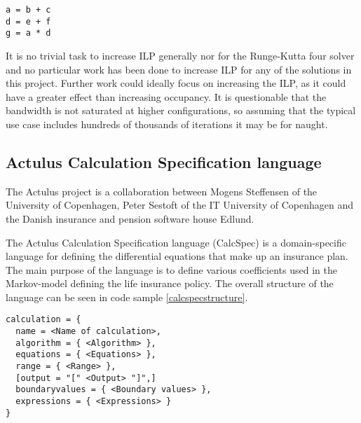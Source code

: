 \begin{lstlisting}[caption=ILP example program, label=ilpexample]
a = b + c
d = e + f
g = a * d
\end{lstlisting}

It is no trivial task to increase ILP generally nor for the Runge-Kutta four solver and no particular work has been done to increase ILP for any of the solutions in this project.
Further work could ideally focus on increasing the ILP, as it could have a greater effect than increasing occupancy.
It is questionable that the bandwidth is not saturated at higher configurations, so assuming that the typical use case includes hundreds of thousands of iterations it may be for naught.

\subsection{Actulus Calculation Specification language}\label{subsec:background:calcspec}
The Actulus project is a collaboration between Mogens Steffensen of the University of Copenhagen, Peter Sestoft of the IT University of Copenhagen and the Danish insurance and pension software house Edlund.

The Actulus Calculation Specification language (CalcSpec) is a domain-specific language for defining the differential equations that make up an insurance plan.
The main purpose of the language is to define various coefficients used in the Markov-model defining the life insurance policy.
The overall structure of the language can be seen in code sample \ref{calcspecstructure}.
\begin{lstlisting}[caption=CalcSpec structure, label=calcspecstructure, language=calcspec]
calculation = {
  name = <Name of calculation>,
  algorithm = { <Algorithm> },
  equations = { <Equations> },
  range = { <Range> },
  [output = "[" <Output> "]",]
  boundaryvalues = { <Boundary values> },
  expressions = { <Expressions> }
}
\end{lstlisting}

